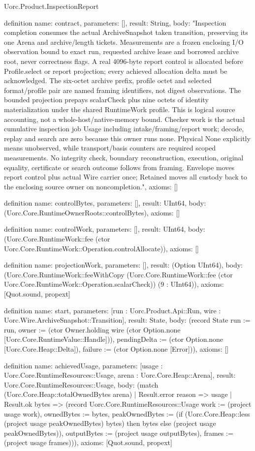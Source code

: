 \begin{lexlean}{Uorc.Product.InspectionReport}
\begin{semanticmodule}
definition{
  name: contract,
  parameters: [],
  result: String,
  body: "Inspection completion consumes the actual ArchiveSnapshot taken transition, preserving its one Arena and archive/length tickets. Measurements are a frozen enclosing I/O observation bound to exact run, requested archive lease and borrowed archive root, never correctness flags. A real 4096-byte report control is allocated before Profile.select or report projection; every achieved allocation delta must be acknowledged. The six-octet archive prefix, profile octet and selected format/profile pair are named framing identifiers, not digest observations. The bounded projection prepays scalarCheck plus nine octets of identity materialization under the shared RuntimeWork profile. This is logical source accounting, not a whole-host/native-memory bound. Checker work is the actual cumulative inspection job Usage including intake/framing/report work; decode, replay and search are zero because this owner runs none. Physical None explicitly means unobserved, while transport/basis counters are required scoped measurements. No integrity check, boundary reconstruction, execution, original equality, certificate or search outcome follows from framing. Envelope moves report control plus actual Wire carrier once; Retained moves all custody back to the enclosing source owner on noncompletion.",
  axioms: []
}

definition{
  name: controlBytes,
  parameters: [],
  result: UInt64,
  body: (Uorc.Core.RuntimeOwnerRoots::controlBytes),
  axioms: []
}

definition{
  name: controlWork,
  parameters: [],
  result: UInt64,
  body: (Uorc.Core.RuntimeWork::fee (ctor Uorc.Core.RuntimeWork::Operation.controlAllocate)),
  axioms: []
}

definition{
  name: projectionWork,
  parameters: [],
  result: (Option UInt64),
  body: (Uorc.Core.RuntimeWork::feeWithCopy (Uorc.Core.RuntimeWork::fee (ctor Uorc.Core.RuntimeWork::Operation.scalarCheck)) (9 : UInt64)),
  axioms: [Quot.sound, propext]
}

definition{
  name: start,
  parameters: [run : Uorc.Product.Api::Run, wire : Uorc.Wire.ArchiveSnapshot::Transition],
  result: State,
  body: (record State {run := run, owner := (ctor Owner.holding wire (ctor Option.none [Uorc.Core.RuntimeValue::Handle])), pendingDelta := (ctor Option.none [Uorc.Core.Heap::Delta]), failure := (ctor Option.none [Error])}),
  axioms: []
}

definition{
  name: achievedUsage,
  parameters: [usage : Uorc.Core.RuntimeResources::Usage, arena : Uorc.Core.Heap::Arena],
  result: Uorc.Core.RuntimeResources::Usage,
  body: (match (Uorc.Core.Heap::totalOwnedBytes arena)
    | Result.error reason => usage
    | Result.ok bytes => (record Uorc.Core.RuntimeResources::Usage {work := (project usage work), ownedBytes := bytes, peakOwnedBytes := (if (Uorc.Core.Heap::less (project usage peakOwnedBytes) bytes) then bytes else (project usage peakOwnedBytes)), outputBytes := (project usage outputBytes), frames := (project usage frames)})),
  axioms: [Quot.sound, propext]
}


\end{semanticmodule}
\end{lexlean}
